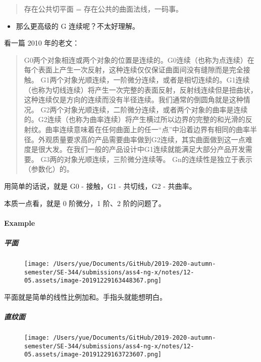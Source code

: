 \documentclass[
]{article}
\begin{document}
\begin{quote}
存在公共切平面 = 存在公共的曲面法线，一码事。
\end{quote}

\begin{itemize}
\item
  那么更高级的 G 连续呢？不太好理解。
\end{itemize}

看一篇 2010 年的老文：

\begin{quote}
G0两个对象相连或两个对象的位置是连续的。G0连续（也称为点连续）在每个表面上产生一次反射，这种连续仅仅保证曲面间没有缝隙而是完全接触。
G1两个对象光顺连续，一阶微分连续，或者是相切连续的。G1连续（也称为切线连续）将产生一次完整的表面反射，反射线连续但是扭曲状，这种连续仅是方向的连续而没有半径连续。我们通常的倒圆角就是这种情况。
G2两个对象光顺连续，二阶微分连续，或者两个对象的曲率是连续的。G2连续（也称为曲率连续）将产生横过所以边界的完整的和光滑的反射纹。曲率连续意味着在任何曲面上的任一``点''中沿着边界有相同的曲率半径。外观质量要求高的产品需要曲率做到G2连续，其实曲面做到这一点难度是很大发。在我们一般的产品设计中G1连续就能满足大部分产品开发需要。
G3两的对象光顺连续，三阶微分连续等。
Gn的连续性是独立于表示（参数化）的。
\end{quote}

用简单的话说，就是 G0 - 接触，G1 - 共切线，G2 - 共曲率。

本质一点看，就是 0 阶微分，1 阶、2 阶的问题了。

\hypertarget{header-n91}{%
\paragraph{Example}\label{header-n91}}

\hypertarget{header-n92}{%
\subparagraph{平面}\label{header-n92}}

\begin{figure}
\centering
\texttt{[image: /Users/yue/Documents/GitHub/2019-2020-autumn-semester/SE-344/submissions/ass4-ng-x/notes/12-05.assets/image-20191229163448367.png]}
\caption{}
\end{figure}

平面就是简单的线性比例加和。手指头就能想明白。

\hypertarget{header-n95}{%
\subparagraph{直纹面}\label{header-n95}}

\begin{figure}
\centering
\texttt{[image: /Users/yue/Documents/GitHub/2019-2020-autumn-semester/SE-344/submissions/ass4-ng-x/notes/12-05.assets/image-20191229163723607.png]}
\caption{}
\end{figure}
\end{document}
